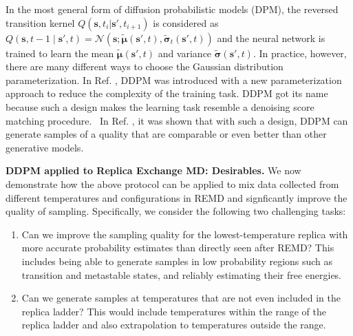 In the most general form of diffusion probabilistic models (DPM),\cite{Ho2020DDPM} the reversed transition kernel $Q( \mathbf{s}, t_{i}| \mathbf{s'}, t_{i+1})$ is considered as $
Q(\mathbf{s}, t-1 \mid \mathbf{s'}, t)=\mathcal{N}(\mathbf{s} ; \tilde{\boldsymbol{\mu}}(\mathbf{s'}, t), \tilde{\boldsymbol{\sigma}}_{t}(\mathbf{s'}, t) )$ and the neural network is trained to learn the mean $\tilde{\boldsymbol{\mu}}(\mathbf{s'},t) $ and variance $\tilde{\boldsymbol{\sigma}}(\mathbf{s'}, t)$. In practice, however, there are many different ways to choose the Gaussian distribution parameterization. In Ref. \cite{Ho2020DDPM}, DDPM was introduced with a new parameterization approach to reduce the complexity of the training task. DDPM got its name because such a design makes the learning task resemble a denoising score matching procedure.~\cite{vincent2011connection} In Ref. , it was shown that with such a design, DDPM can generate samples of a quality that are comparable or even better than other generative models. 

\textbf{DDPM applied to Replica Exchange MD: Desirables.} We now demonstrate how the above protocol can be applied to mix data collected from different temperatures and configurations in REMD and signficantly improve the quality of sampling. Specifically, we consider the following two challenging tasks:
\begin{enumerate}
    \item Can we improve the sampling quality for the lowest-temperature replica with more accurate probability estimates than directly seen after REMD? This includes being able to generate samples in low probability regions such as transition and metastable states, and reliably estimating their free energies.
    \item Can we generate samples at temperatures that are not even included in the replica ladder? This would include temperatures within the range of the replica ladder and also extrapolation to temperatures outside the range.
\end{enumerate} 

